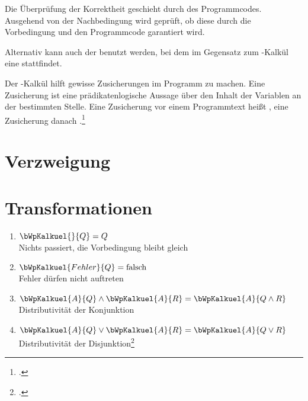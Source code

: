 \documentclass{bschlangaul-theorie}
\let\wp=\bWpKalkuel
\begin{document}
Die Überprüfung der Korrektheit geschieht durch 
des Programmcodes. Ausgehend von der Nachbedingung wird geprüft, ob
diese durch die Vorbedingung und den Programmcode garantiert wird.

Alternativ kann auch der  benutzt werden, bei dem im
Gegensatz zum -Kalkül eine  stattfindet.

Der -Kalkül hilft gewisse Zusicherungen im Programm zu machen.
Eine Zusicherung ist eine prädikatenlogische Aussage über den Inhalt der
Variablen an der bestimmten Stelle. Eine Zusicherung vor einem
Programmtext heißt , eine Zusicherung danach
.\footcite{wiki:wp-kalkuel}

%

\section{Verzweigung}

\bWpErklaerungVerzweigung

\section{Transformationen}

\begin{enumerate}
\item $\wp{}{Q} = Q$ \\
Nichts passiert, die Vorbedingung bleibt gleich

\item $\wp{Fehler}{Q} = \text{falsch}$ \\
Fehler dürfen nicht auftreten

\item $\wp{A}{Q} \land \wp{A}{R} = \wp{A}{Q \land R}$ \\
Distributivität der Konjunktion

\item $\wp{A}{Q} \lor \wp{A}{R} = \wp{A}{Q \lor R}$ \\
Distributivität der Disjunktion\footcite{wiki:wp-kalkuel}
\end{enumerate}

%
\end{document}
